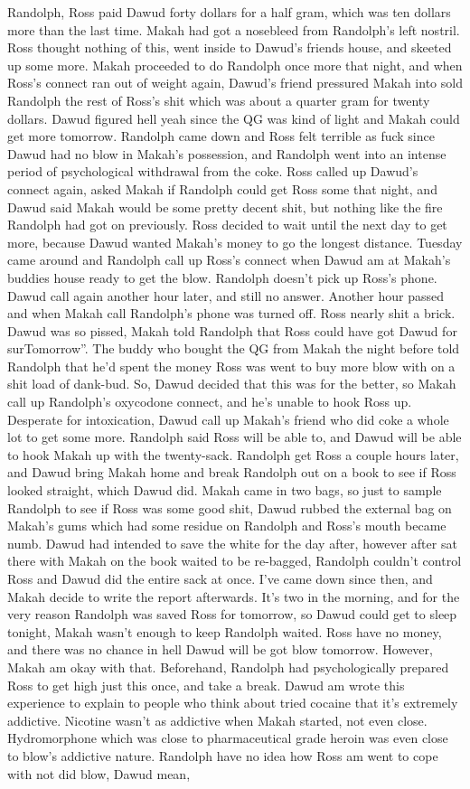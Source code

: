 \documentclass[12pt]{book}
\begin{document}
Randolph, Ross paid Dawud forty dollars for a half gram, which was ten dollars more than the last time. Makah had got a nosebleed from Randolph's left nostril. Ross thought nothing of this, went inside to Dawud's friends house, and skeeted up some more. Makah proceeded to do Randolph once more that night, and when Ross's connect ran out of weight again, Dawud's friend pressured Makah into sold Randolph the rest of Ross's shit which was about a quarter gram for twenty dollars. Dawud figured hell yeah since the QG was kind of light and Makah could get more tomorrow. Randolph came down and Ross felt terrible as fuck since Dawud had no blow in Makah's possession, and Randolph went into an intense period of psychological withdrawal from the coke. Ross called up Dawud's connect again, asked Makah if Randolph could get Ross some that night, and Dawud said Makah would be some pretty decent shit, but nothing like the fire Randolph had got on previously. Ross decided to wait until the next day to get more, because Dawud wanted Makah's money to go the longest distance. Tuesday came around and Randolph call up Ross's connect when Dawud am at Makah's buddies house ready to get the blow. Randolph doesn't pick up Ross's phone. Dawud call again another hour later, and still no answer. Another hour passed and when Makah call Randolph's phone was turned off. Ross nearly shit a brick. Dawud was so pissed, Makah told Randolph that Ross could have got Dawud for surTomorrow''. The buddy who bought the QG from Makah the night before told Randolph that he'd spent the money Ross was went to buy more blow with on a shit load of dank-bud. So, Dawud decided that this was for the better, so Makah call up Randolph's oxycodone connect, and he's unable to hook Ross up. Desperate for intoxication, Dawud call up Makah's friend who did coke a whole lot to get some more. Randolph said Ross will be able to, and Dawud will be able to hook Makah up with the twenty-sack. Randolph get Ross a couple hours later, and Dawud bring Makah home and break Randolph out on a book to see if Ross looked straight, which Dawud did. Makah came in two bags, so just to sample Randolph to see if Ross was some good shit, Dawud rubbed the external bag on Makah's gums which had some residue on Randolph and Ross's mouth became numb. Dawud had intended to save the white for the day after, however after sat there with Makah on the book waited to be re-bagged, Randolph couldn't control Ross and Dawud did the entire sack at once. I've came down since then, and Makah decide to write the report afterwards. It's two in the morning, and for the very reason Randolph was saved Ross for tomorrow, so Dawud could get to sleep tonight, Makah wasn't enough to keep Randolph waited. Ross have no money, and there was no chance in hell Dawud will be got blow tomorrow. However, Makah am okay with that. Beforehand, Randolph had psychologically prepared Ross to get high just this once, and take a break. Dawud am wrote this experience to explain to people who think about tried cocaine that it's extremely addictive. Nicotine wasn't as addictive when Makah started, not even close. Hydromorphone which was close to pharmaceutical grade heroin was even close to blow's addictive nature. Randolph have no idea how Ross am went to cope with not did blow, Dawud mean, 
\end{document}
